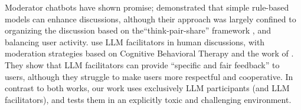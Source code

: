 Moderator chatbots have shown promise; \citet{kim_et_al_chatbot} demonstrated that simple rule-based models can enhance discussions, although their approach was largely confined to organizing the discussion based on the``think-pair-share'' framework \cite{ahmad_2010_supporting, Navajas2018}, and balancing user activity. \citet{cho-etal-2024-language} use \ac{LLM} facilitators in human discussions, with moderation strategies based on Cognitive Behavioral Therapy and the work of \citet{rosenberg2015nonviolent}. They show that \ac{LLM} facilitators can provide “specific and fair feedback” to users, although they struggle to make users more respectful and cooperative.  In contrast to both works, our work uses exclusively \ac{LLM} participants (and \ac{LLM} facilitators), and tests them in an explicitly toxic and challenging environment.